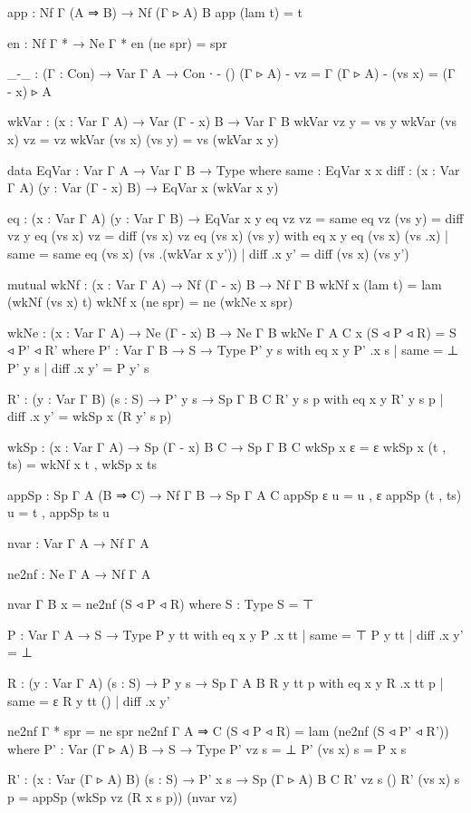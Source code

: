 \begin{code}[hide]
app : Nf Γ (A ⇒ B) → Nf (Γ ▹ A) B
app (lam t) = t

en : Nf Γ * → Ne Γ *
en (ne spr) = spr

_-_ : (Γ : Con) → Var Γ A → Con
∙ - ()
(Γ ▹ A) - vz = Γ
(Γ ▹ A) - (vs x) = (Γ - x) ▹ A

wkVar : (x : Var Γ A) → Var (Γ - x) B → Var Γ B
wkVar vz y = vs y
wkVar (vs x) vz = vz
wkVar (vs x) (vs y) = vs (wkVar x y)

data EqVar : Var Γ A → Var Γ B → Type where
  same : EqVar x x
  diff : (x : Var Γ A) (y : Var (Γ - x) B) → EqVar x (wkVar x y)

eq : (x : Var Γ A) (y : Var Γ B) → EqVar x y
eq vz vz = same
eq vz (vs y) = diff vz y
eq (vs x) vz = diff (vs x) vz
eq (vs x) (vs y) with eq x y
eq (vs x) (vs .x)            | same = same
eq (vs x) (vs .(wkVar x y')) | diff .x y' = diff (vs x) (vs y')

mutual
  wkNf : (x : Var Γ A) → Nf (Γ - x) B → Nf Γ B
  wkNf x (lam t) = lam (wkNf (vs x) t)
  wkNf x (ne spr) = ne (wkNe x spr)

  wkNe : (x : Var Γ A) → Ne (Γ - x) B → Ne Γ B
  wkNe {Γ} {A} {C} x (S ◃ P ◃ R) = S ◃ P' ◃ R'
    where
    P' : Var Γ B → S → Type
    P' y  s with eq x y
    P' .x s | same = ⊥
    P' y  s | diff .x y' = P y' s

    R' : (y : Var Γ B) (s : S) → P' y s → Sp Γ B C
    R' y s p with eq x y
    R' y s p | diff .x y' = wkSp x (R y' s p)

  wkSp : (x : Var Γ A) → Sp (Γ - x) B C → Sp Γ B C
  wkSp x ε = ε
  wkSp x (t , ts) = wkNf x t , wkSp x ts

appSp : Sp Γ A (B ⇒ C) → Nf Γ B → Sp Γ A C
appSp ε u = u , ε
appSp (t , ts) u = t , appSp ts u

nvar : Var Γ A → Nf Γ A

ne2nf : Ne Γ A → Nf Γ A

nvar {Γ} {B} x = ne2nf (S ◃ P ◃ R)
  where
  S : Type
  S = ⊤

  P : Var Γ A → S → Type
  P y  tt with eq x y
  P .x tt | same = ⊤
  P y  tt | diff .x y' = ⊥

  R : (y : Var Γ A) (s : S) → P y s → Sp Γ A B
  R y tt p with eq x y
  R .x tt p | same = ε
  R y tt () | diff .x y'

ne2nf {Γ} {*} spr = ne spr
ne2nf {Γ} {A ⇒ C} (S ◃ P ◃ R) = lam (ne2nf (S ◃ P' ◃ R'))
  where
  P' : Var (Γ ▹ A) B → S → Type
  P' vz s = ⊥
  P' (vs x) s = P x s

  R' : (x : Var (Γ ▹ A) B) (s : S) → P' x s → Sp (Γ ▹ A) B C
  R' vz s ()
  R' (vs x) s p = appSp (wkSp vz (R x s p)) (nvar vz)


\end{code}
